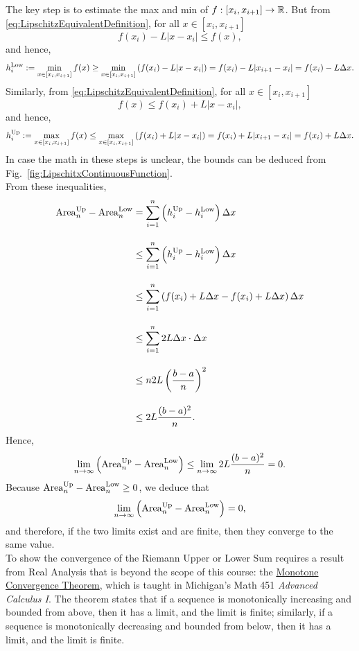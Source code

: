 The key step is to estimate the max and min of $f:[x_i, x_{i+1}] \to \mathbb R$. But from \eqref{eq:LipschitzEquivalentDefinition}, for all $x \in [x_i, x_{i+1}]$
$$    f(x_i) - L |x - x_i| \le f(x), $$
and hence, 
$$h_i^{\rm Low}:=\min_{x \in [x_i, x_{i+1}]} f(x) \ge \min_{x \in [x_i, x_{i+1}]} \left(  f(x_i) - L |x - x_i| \right)  = f(x_i) - L |x_{i+1} - x_i | = f(x_i) - L \Delta x.$$
Similarly, 
from \eqref{eq:LipschitzEquivalentDefinition}, for all $x \in [x_i, x_{i+1}]$
$$    f(x) \le f(x_i) + L |x - x_i|, $$
and hence, 
$$ h_i^{\rm Up}:=\max_{x \in [x_i, x_{i+1}]} f(x) \le \max_{x \in [x_i, x_{i+1}]} \left(  f(x_i) + L |x - x_i| \right)  = f(x_i) + L |x_{i+1} - x_i | = f(x_i) + L \Delta x.$$
In case the math in these steps is unclear, the bounds can be deduced from Fig.~\ref{fig:LipschitxContinuousFunction}.\\

From these inequalities, 
\begin{align*}
     {\rm Area}^{\rm Up}_n - {\rm Area}^{\rm Low}_n &= \sum_{i=1}^n \left(  h_i^{\rm Up}  - h_i^{\rm Low}\right) \Delta x  \\[1em] 
     & \le \sum_{i=1}^n \left(  h_i^{\rm Up}  - h_i^{\rm Low}\right) \Delta x \\[1em]
     &\le \sum_{i=1}^n \left( f(x_i) + L \Delta x  - f(x_i) + L \Delta x \right) \Delta x \\[1em]
     &\le  \sum_{i=1}^n 2  L \Delta x \cdot \Delta x \\[1em]
     &\le n 2 L \left( \frac{b-a}{n} \right)^2 \\[1em]
     &\le 2 L  \frac{(b-a)^2}{n}.
\end{align*}
Hence, 
$$ \lim_{n \to \infty} \left( {\rm Area}^{\rm Up}_n - {\rm Area}^{\rm Low}_n \right) \le  \lim_{n \to \infty}  2 L  \frac{(b-a)^2}{n} = 0.$$
Because ${\rm Area}^{\rm Up}_n - {\rm Area}^{\rm Low}_n \ge 0$, we deduce that
$$ \lim_{n \to \infty}\left({\rm Area}^{\rm Up}_n - {\rm Area}^{\rm Low}_n \right)  = 0,$$
and therefore, if the two limits exist and are finite, then they converge to the same value.\\

To show the convergence of the Riemann Upper or Lower Sum requires a result from Real Analysis that is beyond the scope of this course: the \href{https://en.wikipedia.org/wiki/Monotone_convergence_theorem#:~:text=Informally%2C%20the%20theorems%20state%20that,will%20converge%20to%20the%20infimum.}{Monotone Convergence Theorem}, which is taught in Michigan's Math 451 \textit{Advanced Calculus I}. The theorem states that if a sequence is monotonically increasing and bounded from above, then it has a limit, and the limit is finite; similarly, if a sequence is monotonically decreasing and bounded from below, then it has a limit, and the limit is finite. \\

